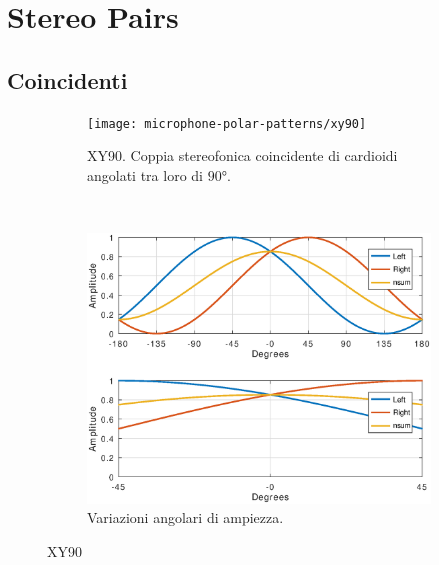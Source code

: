 \section{Stereo Pairs}

\subsection{Coincidenti}

\begin{figure}[t]
    \centering
    \begin{subfigure}[t]{0.99\textwidth}
        \centering
        \texttt{[image: microphone-polar-patterns/xy90]}
        \caption{XY90. Coppia stereofonica coincidente di cardioidi angolati tra loro di $90°$.}%
        \label{pol:xy90sp}
    \end{subfigure}%
    \\
    \begin{subfigure}[t]{0.99\textwidth}
        \centering
        \includegraphics[width=12.5cm]{CAPITOLI/1000/IMG/xy90sub}
        \caption{Variazioni angolari di ampiezza.}%
        \label{plot:xy90}
    \end{subfigure}
    \caption{XY90}
    \label{sp:xy90}
\end{figure}

\clearpage

